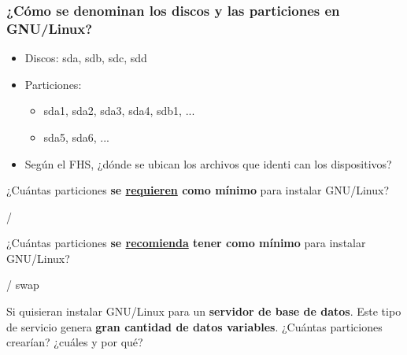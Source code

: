 \begin{frame}
  \frametitle{¿Cómo se denominan los discos y las particiones en GNU/Linux?}
  \begin{itemize}
	  \item Discos: sda, sdb, sdc, sdd
	  \item Particiones:
	  \begin{itemize}
	  	\item sda1, sda2, sda3, sda4, sdb1, ...
	  	\item sda5, sda6, ...
	  \end{itemize}
	  \item Según el FHS, ¿dónde se ubican los archivos que identi can los dispositivos?
  \end{itemize}
\end{frame}

\begin{frame}
  \begin{center}
    \vfill
    \huge ¿Cuántas particiones \textbf{se \underline{requieren} como mínimo} para instalar GNU/Linux?
    \vfill
  \end{center}
\end{frame}

\begin{frame}
  \begin{center}
    \vfill
    \huge /
    \vfill
  \end{center}
\end{frame}

\begin{frame}
  \begin{center}
    \vfill
    \huge ¿Cuántas particiones \textbf{se \underline{recomienda} tener como mínimo} para instalar GNU/Linux?
    \vfill
  \end{center}
\end{frame}

\begin{frame}
  \begin{center}
    \vfill
    \huge /
    \vfill
    \vfill
    \huge swap
    \vfill
  \end{center}
\end{frame}

\begin{frame}
  \begin{center}
    \vfill
    \huge Si quisieran instalar GNU/Linux para un \textbf{servidor de base de datos}.
    \vfill
    \vfill
    \huge Este tipo de servicio genera \textbf{gran cantidad de datos variables}.
    \vfill
    \vfill
    \huge ¿Cuántas particiones crearían? ¿cuáles y por qué?
    \vfill
  \end{center}
\end{frame}

